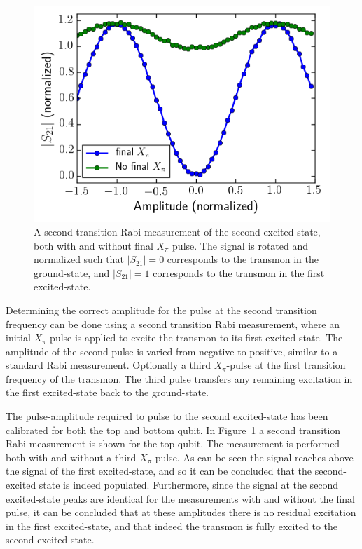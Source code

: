         \begin{figure}
          \begin{center}
          \vspace{-30pt}
            \includegraphics[width=\textwidth]{../Figures/Qubit characterization/Rabi12.png}
          \end{center}
          \vspace{-20 pt}
          \caption{A second transition Rabi measurement of the second excited-state, both with and without final $X_\pi$ pulse. The signal is rotated and normalized such that $\left|S_{21}\right|=0$ corresponds to the transmon in the ground-state, and $\left|S_{21}\right|=1$ corresponds to the transmon in the first excited-state.}
          \label{fig:Rabi12}
        \end{figure}

        Determining the correct amplitude for the pulse at the second transition frequency can be done using a second transition Rabi measurement, where an initial $X_\pi$-pulse is applied to excite the transmon to its first excited-state. The amplitude of the second pulse is varied from negative to positive, similar to a standard Rabi measurement. Optionally a third $X_\pi$-pulse at the first transition frequency of the transmon. The third pulse transfers any remaining excitation in the first excited-state back to the ground-state.

        The pulse-amplitude required to pulse to the second excited-state has been calibrated for both the top and bottom qubit. In Figure~\ref{fig:Rabi12} a second transition Rabi measurement is shown for the top qubit. The measurement is performed both with and without a third $X_\pi$ pulse. As can be seen the signal reaches above the signal of the first excited-state, and so it can be concluded that the second-excited state is indeed populated. Furthermore, since the signal at the second excited-state peaks are identical for the measurements with and without the final pulse, it can be concluded that at these amplitudes there is no residual excitation in the first excited-state, and that indeed the transmon is fully excited to the second excited-state.


